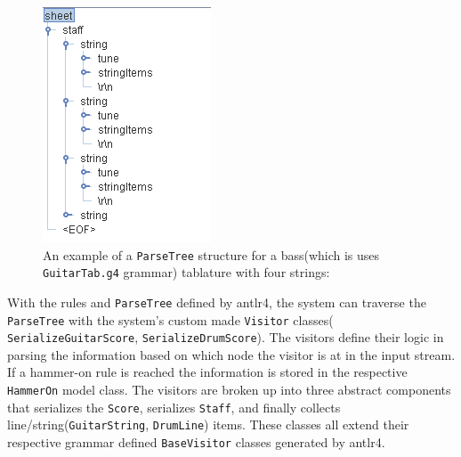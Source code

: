 \documentclass[11pt]{article}
\begin{document}
\begin{figure}[htbp]
\centering
\includegraphics[width=.9\linewidth]{./Diagrams/bass-parse-tree.png}
\caption{An example of a \texttt{ParseTree} structure for a bass(which is uses \texttt{GuitarTab.g4} grammar) tablature with four strings:}
\end{figure}

With the rules and \texttt{ParseTree} defined by antlr4, the system can traverse the \texttt{ParseTree} with the system’s custom made \texttt{Visitor} classes( \texttt{SerializeGuitarScore}, \texttt{SerializeDrumScore}). The visitors define their logic in parsing the information based on which node the visitor is at in the input stream. If a hammer-on rule is reached the information is stored in the respective \texttt{HammerOn} model class. The visitors are broken up into three abstract components that serializes the \texttt{Score}, serializes \texttt{Staff}, and finally collects line/string(\texttt{GuitarString}, \texttt{DrumLine}) items. These classes all extend  their respective grammar defined \texttt{BaseVisitor} classes generated by antlr4.
\end{document}
